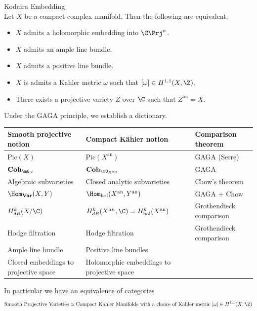 \documentclass[a4paper]{article}
\begin{document}
\begin{thm}{Kodaira Embedding}{}\\
Let $X$ be a compact complex manifold. Then the following are equivalent. 
\begin{itemize}
\item $X$ admits a holomorphic embedding into $\C\Prj^n$. 
\item $X$ admits an ample line bundle. 
\item $X$ admits a positive line bundle. 
\item $X$ is admits a Kahler metric $\omega$ such that $[\omega]\in H^{1,1}(X,\Z)$. 
\item There exists a projective variety $Z$ over $\C$ such that $Z^\text{an}=X$. 
\end{itemize}
\end{thm}

Under the GAGA principle, we establish a dictionary. 

\begin{table}[h]
\centering
\renewcommand{\arraystretch}{1.4}
\begin{tabular}{@{} p{5cm} p{5cm} p{4.3cm} @{}}
\toprule
\textbf{Smooth projective notion} & \textbf{Compact K\"ahler notion} & \textbf{Comparison theorem} \\
\midrule
$\text{Pic}(X)$ & $\text{Pic}(X^\text{an})$ & GAGA (Serre) \\
$\bold{Coh}_{\mO_X}$ & $\bold{Coh}_{\mO_{X^\text{an}}}$ & GAGA \\
Algebraic subvarieties & Closed analytic subvarieties & Chow's theorem \\
$\Hom_{\bold{Var}}(X,Y)$ & $\Hom_\text{hol}(X^\text{an},Y^\text{an})$ & GAGA + Chow \\
$H_{dR}^k(X/\C)$ & $H_{dR}^k(X^{an},\C)=H_\text{hol}^k(X^\text{an})$ & Grothendieck comparison \\
Hodge filtration & Hodge filtration & Grothendieck comparison \\
Ample line bundle & Positive line bundles \\
Closed embeddings to projective space & Holomorphic embeddings to projective space\\
\bottomrule
\end{tabular}
\end{table}
 
In particular we have an equivalence of categories $$\text{Smooth Projective Varieties}\simeq\text{Compact Kahler Manifolds with a choice of Kahler metric }[\omega]\in H^{1,1}(X;\Z)$$
\end{document}
